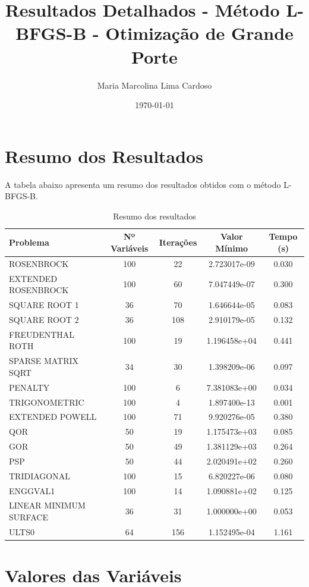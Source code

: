 \documentclass[12pt]{article}
\title{Resultados Detalhados - Método L-BFGS-B - Otimização de Grande Porte}
\author{Maria Marcolina Lima Cardoso}
\date{\today}
\begin{document}
\maketitle

\section{Resumo dos Resultados}

A tabela abaixo apresenta um resumo dos resultados obtidos com o método L-BFGS-B.

\begin{table}[h!]
\centering
\caption{Resumo dos resultados}
\label{tab:resumo}
\begin{tabular}{@{}lcccc@{}}
\toprule
\textbf{Problema} & \textbf{Nº Variáveis} & \textbf{Iterações} & \textbf{Valor Mínimo} & \textbf{Tempo (s)} \\
\midrule
ROSENBROCK & 100 & 22 & 2.723017e-09 & 0.030 \\
EXTENDED ROSENBROCK & 100 & 60 & 7.047449e-07 & 0.300 \\
SQUARE ROOT 1 & 36 & 70 & 1.646644e-05 & 0.083 \\
SQUARE ROOT 2 & 36 & 108 & 2.910179e-05 & 0.132 \\
FREUDENTHAL ROTH & 100 & 19 & 1.196458e+04 & 0.441 \\
SPARSE MATRIX SQRT & 34 & 30 & 1.398209e-06 & 0.097 \\
PENALTY & 100 & 6 & 7.381083e+00 & 0.034 \\
TRIGONOMETRIC & 100 & 4 & 1.897400e-13 & 0.001 \\
EXTENDED POWELL & 100 & 71 & 9.920276e-05 & 0.380 \\
QOR & 50 & 19 & 1.175473e+03 & 0.085 \\
GOR & 50 & 49 & 1.381129e+03 & 0.264 \\
PSP & 50 & 44 & 2.020491e+02 & 0.260 \\
TRIDIAGONAL & 100 & 15 & 6.820227e-06 & 0.080 \\
ENGGVAL1 & 100 & 14 & 1.090881e+02 & 0.125 \\
LINEAR MINIMUM SURFACE & 36 & 31 & 1.000000e+00 & 0.053 \\
ULTS0 & 64 & 156 & 1.152495e-04 & 1.161 \\

\bottomrule
\end{tabular}
\end{table}

\section{Valores das Variáveis}
\end{document}
